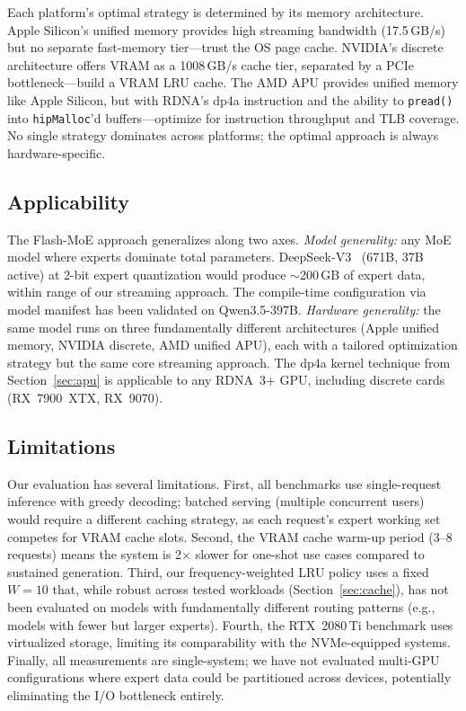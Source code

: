 \documentclass[10pt]{article}
\begin{document}
Each platform's optimal strategy is determined by its memory architecture. Apple Silicon's unified memory provides high streaming bandwidth (17.5\,GB/s) but no separate fast-memory tier---trust the OS page cache. NVIDIA's discrete architecture offers VRAM as a 1008\,GB/s cache tier, separated by a PCIe bottleneck---build a VRAM LRU cache. The AMD APU provides unified memory like Apple Silicon, but with RDNA's dp4a instruction and the ability to \texttt{pread()} into \texttt{hipMalloc}'d buffers---optimize for instruction throughput and TLB coverage. No single strategy dominates across platforms; the optimal approach is always hardware-specific.

\subsection{Applicability}

The Flash-MoE approach generalizes along two axes. \emph{Model generality:} any MoE model where experts dominate total parameters. DeepSeek-V3~\citep{deepseekv3} (671B, 37B active) at 2-bit expert quantization would produce $\sim$200\,GB of expert data, within range of our streaming approach. The compile-time configuration via model manifest has been validated on Qwen3.5-397B. \emph{Hardware generality:} the same model runs on three fundamentally different architectures (Apple unified memory, NVIDIA discrete, AMD unified APU), each with a tailored optimization strategy but the same core streaming approach. The dp4a kernel technique from Section~\ref{sec:apu} is applicable to any RDNA~3+ GPU, including discrete cards (RX~7900~XTX, RX~9070).

\subsection{Limitations}

Our evaluation has several limitations. First, all benchmarks use single-request inference with greedy decoding; batched serving (multiple concurrent users) would require a different caching strategy, as each request's expert working set competes for VRAM cache slots. Second, the VRAM cache warm-up period (3--8 requests) means the system is 2$\times$ slower for one-shot use cases compared to sustained generation. Third, our frequency-weighted LRU policy uses a fixed $W=10$ that, while robust across tested workloads (Section~\ref{sec:cache}), has not been evaluated on models with fundamentally different routing patterns (e.g., models with fewer but larger experts). Fourth, the RTX~2080\,Ti benchmark uses virtualized storage, limiting its comparability with the NVMe-equipped systems. Finally, all measurements are single-system; we have not evaluated multi-GPU configurations where expert data could be partitioned across devices, potentially eliminating the I/O bottleneck entirely.
\end{document}
